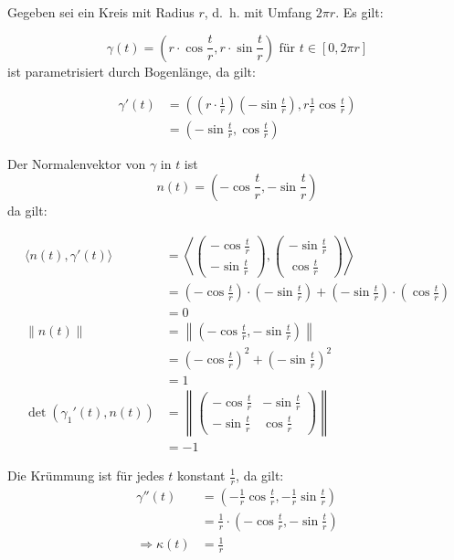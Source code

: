 \begin{beispiel}%
    Gegeben sei ein Kreis mit Radius $r$, d.~h. mit Umfang $2\pi r$.
    Es gilt:

    \[\gamma(t) = \left (r \cdot \cos \frac{t}{r}, r \cdot \sin \frac{t}{r} \right ) \text{ für } t \in [0, 2\pi r]\]
    ist parametrisiert durch Bogenlänge, da gilt:

    \begin{align*}
        \gamma'(t)  &= \left ((r \cdot \frac{1}{r}) (- \sin \frac{t}{r}), r \frac{1}{r} \cos \frac{t}{r} \right )\\
                    &= \left (- \sin \frac{t}{r}, \cos \frac{t}{r} \right )
    \end{align*}

    Der Normalenvektor von $\gamma$ in $t$ ist
    \[n(t) = \left (- \cos \frac{t}{r}, - \sin \frac{t}{r} \right )\]
    da gilt:

    \begin{align*}
        \langle n(t), \gamma'(t) \rangle &= 
        \left \langle 
            \begin{pmatrix}- \cos \frac{t}{r}\\ - \sin \frac{t}{r}\end{pmatrix},
            \begin{pmatrix}- \sin \frac{t}{r}\\ \cos \frac{t}{r}\end{pmatrix}
        \right \rangle\\
        &= (- \cos \frac{t}{r}) \cdot (- \sin \frac{t}{r}) + (- \sin \frac{t}{r}) \cdot (\cos \frac{t}{r})\\
        &= 0\\
        \|n(t)\| &= \left \| (- \cos \frac{t}{r}, - \sin \frac{t}{r}) \right \|\\
        &=(- \cos \frac{t}{r})^2 + (- \sin \frac{t}{r})^2\\
        &= 1\\
        \det(\gamma_1'(t), n(t)) &= \left \|
            \begin{pmatrix}
                - \cos \frac{t}{r} & - \sin \frac{t}{r}\\
                - \sin \frac{t}{r} &   \cos \frac{t}{r}
            \end{pmatrix}
        \right \|\\
        &= -1
    \end{align*}

    Die Krümmung ist für jedes $t$ konstant $\frac{1}{r}$, da gilt:
    \begin{align*}
        \gamma''(t) &= \left (- \frac{1}{r} \cos \frac{t}{r}, - \frac{1}{r} \sin \frac{t}{r} \right )\\
                    &= \frac{1}{r} \cdot \left (- \cos \frac{t}{r}, - \sin \frac{t}{r} \right )\\
        \Rightarrow \kappa(t) &= \frac{1}{r}
    \end{align*}
\end{beispiel}


